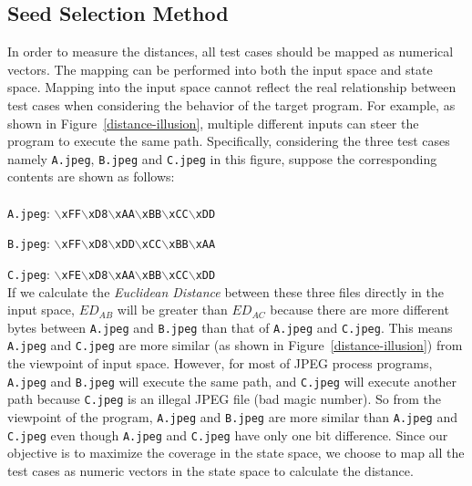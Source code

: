 \subsection{Seed Selection Method}
In order to measure the distances, all test cases should be mapped as numerical vectors. 
The mapping can be performed into both the input space and state space. Mapping into the input space cannot reflect the real relationship between test cases when considering the behavior of the target program. For example, as shown in Figure~\ref{distance-illusion}, multiple different inputs can steer the program to execute the same path. Specifically, considering the three test cases namely \texttt{A.jpeg}, \texttt{B.jpeg} and \texttt{C.jpeg} in this figure, suppose the corresponding contents are shown as follows:
\\
\\
\indent\texttt{A.jpeg}: \texttt{$\backslash$xFF$\backslash$xD8$\backslash$xAA$\backslash$xBB$\backslash$xCC$\backslash$xDD}

\texttt{B.jpeg}: \texttt{$\backslash$xFF$\backslash$xD8$\backslash$xDD$\backslash$xCC$\backslash$xBB$\backslash$xAA}

\texttt{C.jpeg}: \texttt{$\backslash$xFE$\backslash$xD8$\backslash$xAA$\backslash$xBB$\backslash$xCC$\backslash$xDD}
\\

\indent If we calculate the \textit{Euclidean Distance} between these three files directly in the input space, $ED_{AB}$ will be greater than $ED_{AC}$ because there are more different bytes between \texttt{A.jpeg} and \texttt{B.jpeg} than that of \texttt{A.jpeg} and \texttt{C.jpeg}. This means \texttt{A.jpeg} and \texttt{C.jpeg} are more similar (as shown in Figure~\ref{distance-illusion}) from the viewpoint of input space. 
However, for most of JPEG process programs, \texttt{A.jpeg} and \texttt{B.jpeg} will execute the same path, and \texttt{C.jpeg} will execute another path because \texttt{C.jpeg} is an illegal JPEG file (bad magic number). So from the viewpoint of the program, \texttt{A.jpeg} and \texttt{B.jpeg} are more similar than \texttt{A.jpeg} and \texttt{C.jpeg} even though \texttt{A.jpeg} and \texttt{C.jpeg} have only one bit difference. 
Since our objective is to maximize the coverage in the state space, we choose to map all the test cases as numeric vectors in the state space to calculate the distance.

